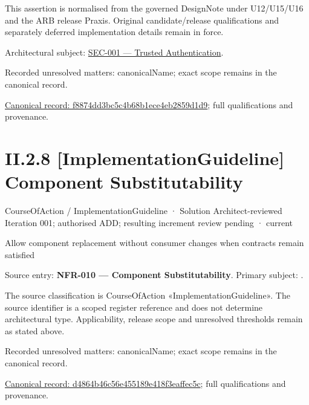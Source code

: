 This assertion is normalised from the governed DesignNote under U12/U15/U16 and the ARB release Praxis. Original candidate/release qualifications and separately deferred implementation details remain in force.



Architectural subject: \hyperref[element:e4998b0a132c41afbe610b11869c3297]{SEC-001 — Trusted Authentication}.


{\small Recorded unresolved matters: canonicalName; exact scope remains in the canonical record.}\par
{\footnotesize \href{../../../../continuum/strategy/course-of-action/implementation-guideline/f8874dd3bc5c4b68b1ece4eb2859d1d9.md}{Canonical record: f8874dd3bc5c4b68b1ece4eb2859d1d9}; full qualifications and provenance.}\par
\section*{II.2.8 [ImplementationGuideline] Component Substitutability}
\label{navigation:II.2.8}

\label{element:d4864b46c56e455189e418f3eaffec5c}
{\small CourseOfAction / ImplementationGuideline · Solution Architect-reviewed Iteration 001; authorised ADD; resulting increment review pending · current}\par

Allow component replacement without consumer changes when contracts remain satisfied



Source entry: \textbf{NFR-010 — Component Substitutability}. Primary subject: \texttt{}.



The source classification is CourseOfAction «ImplementationGuideline». The source identifier is a scoped register reference and does not determine architectural type. Applicability, release scope and unresolved thresholds remain as stated above.


{\small Recorded unresolved matters: canonicalName; exact scope remains in the canonical record.}\par
{\footnotesize \href{../../../../continuum/strategy/course-of-action/implementation-guideline/d4864b46c56e455189e418f3eaffec5c.md}{Canonical record: d4864b46c56e455189e418f3eaffec5c}; full qualifications and provenance.}\par
